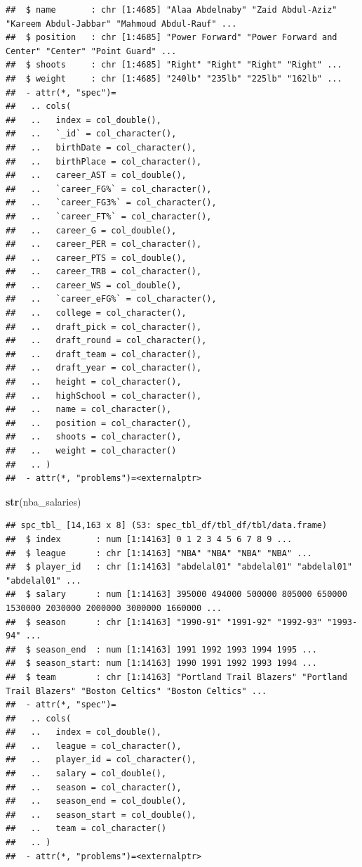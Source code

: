 \documentclass[
]{book}
\newenvironment{Shaded}{\begin{snugshade}}{\end{snugshade}}
\newcommand{\FunctionTok}[1]{\textcolor[rgb]{0.13,0.29,0.53}{\textbf{#1}}}
\newcommand{\NormalTok}[1]{#1}
\begin{document}
\begin{verbatim}
##  $ name       : chr [1:4685] "Alaa Abdelnaby" "Zaid Abdul-Aziz" "Kareem Abdul-Jabbar" "Mahmoud Abdul-Rauf" ...
##  $ position   : chr [1:4685] "Power Forward" "Power Forward and Center" "Center" "Point Guard" ...
##  $ shoots     : chr [1:4685] "Right" "Right" "Right" "Right" ...
##  $ weight     : chr [1:4685] "240lb" "235lb" "225lb" "162lb" ...
##  - attr(*, "spec")=
##   .. cols(
##   ..   index = col_double(),
##   ..   `_id` = col_character(),
##   ..   birthDate = col_character(),
##   ..   birthPlace = col_character(),
##   ..   career_AST = col_double(),
##   ..   `career_FG%` = col_character(),
##   ..   `career_FG3%` = col_character(),
##   ..   `career_FT%` = col_character(),
##   ..   career_G = col_double(),
##   ..   career_PER = col_character(),
##   ..   career_PTS = col_double(),
##   ..   career_TRB = col_character(),
##   ..   career_WS = col_double(),
##   ..   `career_eFG%` = col_character(),
##   ..   college = col_character(),
##   ..   draft_pick = col_character(),
##   ..   draft_round = col_character(),
##   ..   draft_team = col_character(),
##   ..   draft_year = col_character(),
##   ..   height = col_character(),
##   ..   highSchool = col_character(),
##   ..   name = col_character(),
##   ..   position = col_character(),
##   ..   shoots = col_character(),
##   ..   weight = col_character()
##   .. )
##  - attr(*, "problems")=<externalptr>
\end{verbatim}

\begin{Shaded}
\begin{Highlighting}[]
\FunctionTok{str}\NormalTok{(nba\_salaries)}
\end{Highlighting}
\end{Shaded}

\begin{verbatim}
## spc_tbl_ [14,163 x 8] (S3: spec_tbl_df/tbl_df/tbl/data.frame)
##  $ index       : num [1:14163] 0 1 2 3 4 5 6 7 8 9 ...
##  $ league      : chr [1:14163] "NBA" "NBA" "NBA" "NBA" ...
##  $ player_id   : chr [1:14163] "abdelal01" "abdelal01" "abdelal01" "abdelal01" ...
##  $ salary      : num [1:14163] 395000 494000 500000 805000 650000 1530000 2030000 2000000 3000000 1660000 ...
##  $ season      : chr [1:14163] "1990-91" "1991-92" "1992-93" "1993-94" ...
##  $ season_end  : num [1:14163] 1991 1992 1993 1994 1995 ...
##  $ season_start: num [1:14163] 1990 1991 1992 1993 1994 ...
##  $ team        : chr [1:14163] "Portland Trail Blazers" "Portland Trail Blazers" "Boston Celtics" "Boston Celtics" ...
##  - attr(*, "spec")=
##   .. cols(
##   ..   index = col_double(),
##   ..   league = col_character(),
##   ..   player_id = col_character(),
##   ..   salary = col_double(),
##   ..   season = col_character(),
##   ..   season_end = col_double(),
##   ..   season_start = col_double(),
##   ..   team = col_character()
##   .. )
##  - attr(*, "problems")=<externalptr>
\end{verbatim}
\end{document}
